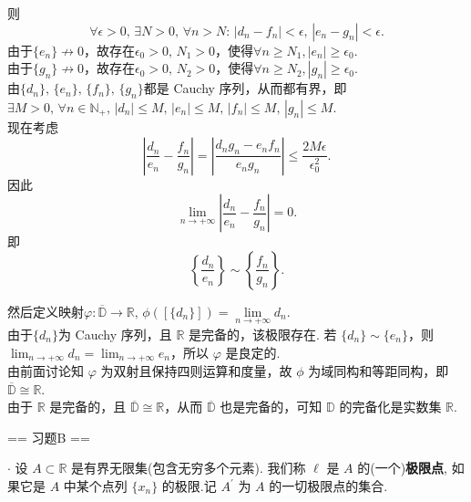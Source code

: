 \begin{enumerate}
\begin{solution}
\begin{enumerate}
\[        \]
        则
        \[
        \forall\epsilon>0,\,\exists N>0,\,\forall n>N:\,\left|d_{n}-f_{n}\right|<\epsilon,\,\left|e_{n}-g_{n}\right|<\epsilon.
        \]
        由于$\{e_{n}\}\not\to 0$，故存在$\epsilon_{0}>0,\,N_{1}>0$，使得$\forall n\geq N_{1},\left|e_{n}\right|\geq \epsilon_{0}$.\\
        由于$\{g_{n}\}\not\to 0$，故存在$\epsilon_{0}>0,\,N_{2}>0$，使得$\forall n\geq N_{2},\left|g_{n}\right|\geq \epsilon_{0}$.\\
        由$\{d_{n}\},\,\{e_{n}\},\,\{f_{n}\},\,\{g_{n}\}$都是 Cauchy 序列，从而都有界，即$\exists M>0,\,\forall n\in\mathbb{N}_{+},\,\left|d_{n}\right|\leq M,\,\left|e_{n}\right|\leq M,\,\left|f_{n}\right|\leq M,\,\left|g_{n}\right|\leq M$.\\
        现在考虑
        \[
        \left|\frac{d_{n}}{e_{n}}-\frac{f_{n}}{g_{n}}\right|=\left|\frac{d_{n}g_{n}-e_{n}f_{n}}{e_{n}g_{n}}\right|\leq 
        \frac{2M\epsilon}{\epsilon_{0}^2}.
        \]
        因此
        \[
        \lim_{n\to +\infty}\left|\frac{d_{n}}{e_{n}}-\frac{f_{n}}{g_{n}}\right|=0.
        \]
        即
        \[
        \left\{\frac{d_{n}}{e_{n}}\right\}\sim\left\{\frac{f_{n}}{g_{n}}\right\}.
        \]

        然后定义映射$\varphi:\overline{\mathbb{D}}\rightarrow\mathbb{R},\,\phi([\{d_{n}\}])=\underset{n\to+\infty}{\lim}d_{n}$.\\
        由于$\{d_{n}\}$为 Cauchy 序列，且 $\mathbb{R}$ 是完备的，该极限存在. 若 $\{d_{n}\}\sim\{e_{n}\}$，则 $\displaystyle\lim_{n\to+\infty} d_{n}=\lim_{n\to+\infty} e_{n}$，所以 $\varphi$ 是良定的.\\
        由前面讨论知 $\varphi$ 为双射且保持四则运算和度量，故 $\phi$ 为域同构和等距同构，即 $\overline{\mathbb{D}}\cong\mathbb{R}$.\\
        由于 $\mathbb{R}$ 是完备的，且 $\overline{\mathbb{D}}\cong\mathbb{R}$，从而 $\overline{\mathbb{D}}$ 也是完备的，可知 $\mathbb{D}$ 的完备化是实数集 $\mathbb{R}$.
        \end{enumerate}
    \end{solution}
\end{enumerate}

== 习题B ==

$\cdot$ 设 $A\subset \mathbb{R}$ 是有界无限集(包含无穷多个元素). 我们称 $\ell$ 是 $A$ 的(一个)\textbf{极限点},
如果它是 $A$ 中某个点列 $\{x_{n}\}$ 的极限.记 $A^{\prime}$ 为 $A$ 的一切极限点的集合.

